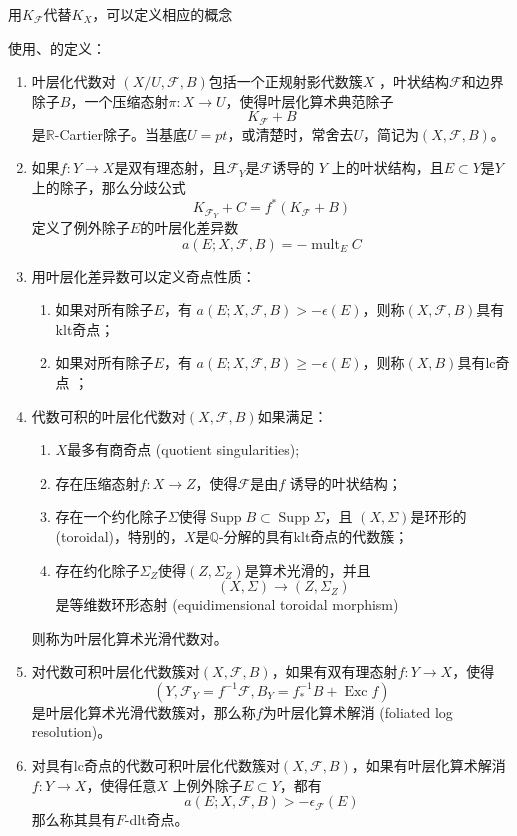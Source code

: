 用$K_{\mathcal{F}}$代替$K_{X}$，可以定义相应的概念
\begin{definition}
使用\cite[3.4.5,6.2.1]{chlx}、\cite[3.2]{acss}的定义：
  \begin{enumerate}
    \item 叶层化代数对 $(X/U,\mathcal{F},B)$包括一个正规射影代数簇$X$ ，叶状结构$\mathcal{F}$和边界除子$B$，一个压缩态射$\pi:X\to U$，使得叶层化算术典范除子
  \[ K_{\mathcal{F}}+B \]
  是$\mathbb{R}$-Cartier除子。当基底$U=pt$，或清楚时，常舍去$U$，简记为$(X,\mathcal{F},B)$。 
    \item 如果$f:Y\to X$是双有理态射，且$\mathcal{F}_{Y} $是$\mathcal{F} $诱导的 $Y$ 上的叶状结构，且$E \subset Y$是$Y$ 上的除子，那么分歧公式
  \[ K_{\mathcal{F}_{Y}}+C=f^{*}(K_{\mathcal{F}}+B) \]
  定义了例外除子$E$的叶层化差异数
  \[ a(E;X,\mathcal{F},B)=- \operatorname{mult}_{E}C \]
    \item 用叶层化差异数可以定义奇点性质：
      \begin{enumerate}
        \item 如果对所有除子$E$，有 $a(E;X,\mathcal{F},B)>-\epsilon(E)$，则称$(X,\mathcal{F},B) $具有klt奇点；
        \item 如果对所有除子$E$，有 $a(E;X,\mathcal{F},B)\geqslant -\epsilon(E)$，则称$(X,B) $具有lc奇点 ；
      \end{enumerate}
    \item 代数可积的叶层化代数对$(X,\mathcal{F},B)$如果满足：
      \begin{enumerate}
        \item $X$最多有商奇点 (quotient singularities);
        \item 存在压缩态射$f:X\to Z$，使得$\mathcal{F}$是由$f$ 诱导的叶状结构； 
        \item 存在一个约化除子$\Sigma$使得$\operatorname{Supp}B \subset \operatorname{Supp} \Sigma $，且 $(X,\Sigma)$是环形的 (toroidal)，特别的，$X$是$\mathbb{Q}$-分解的具有klt奇点的代数簇；
        \item 存在约化除子$\Sigma_{Z}$使得$ (Z,\Sigma_{Z})$是算术光滑的，并且
          \[ (X,\Sigma)\to (Z,\Sigma_{Z}) \]
          是等维数环形态射 (equidimensional toroidal morphism)
      \end{enumerate}
      则称为叶层化算术光滑代数对。
    \item 对代数可积叶层化代数簇对$(X,\mathcal{F},B)$，如果有双有理态射$f:Y\to X$，使得
      \[ (Y,\mathcal{F}_{Y}=f^{-1}\mathcal{F},B_{Y}=f^{-1}_{*}B+ \operatorname{Exc}f) \]
      是叶层化算术光滑代数簇对，那么称$f$为叶层化算术解消 (foliated log resolution)。
    \item 对具有lc奇点的代数可积叶层化代数簇对$(X,\mathcal{F},B)$，如果有叶层化算术解消$f:Y\to X$，使得任意$X$ 上例外除子$E \subset Y$，都有
      \[ a(E;X,\mathcal{F},B)>-\epsilon_{\mathcal{F}}(E) \]
      那么称其具有$F$-dlt奇点。
  \end{enumerate}
\end{definition}
